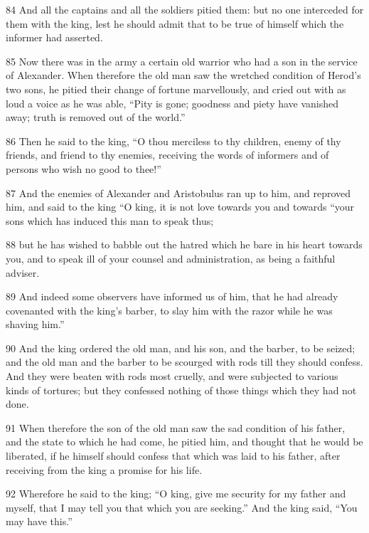 \par 84 And all the captains and all the soldiers pitied them: but no one interceded for them with the king, lest he should admit that to be true of himself which the informer had asserted. 

\par 85 Now there was in the army a certain old warrior who had a son in the service of Alexander. When therefore the old man saw the wretched condition of Herod’s two sons, he pitied their change of fortune marvellously, and cried out with as loud a voice as he was able, “Pity is gone; goodness and piety have vanished away; truth is removed out of the world.” 

\par 86 Then he said to the king, “O thou merciless to thy children, enemy of thy friends, and friend to thy enemies, receiving the words of informers and of persons who wish no good to thee!” 

\par 87 And the enemies of Alexander and Aristobulus ran up to him, and reproved him, and said to the king “O king, it is not love towards you and towards “your sons which has induced this man to speak thus; 

\par 88 but he has wished to babble out the hatred which he bare in his heart towards you, and to speak ill of your counsel and administration, as being a faithful adviser. 

\par 89 And indeed some observers have informed us of him, that he had already covenanted with the king’s barber, to slay him with the razor while he was shaving him.” 

\par 90 And the king ordered the old man, and his son, and the barber, to be seized; and the old man and the barber to be scourged with rods till they should confess. And they were beaten with rods most cruelly, and were subjected to various kinds of tortures; but they confessed nothing of those things which they had not done. 

\par 91 When therefore the son of the old man saw the sad condition of his father, and the state to which he had come, he pitied him, and thought that he would be liberated, if he himself should confess that which was laid to his father, after receiving from the king a promise for his life. 

\par 92 Wherefore he said to the king; “O king, give me security for my father and myself, that I may tell you that which you are seeking.” And the king said, “You may have this.” 

